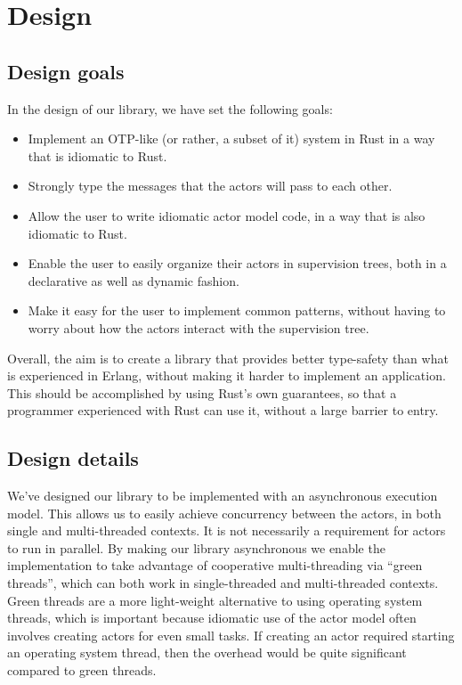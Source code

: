 \documentclass[a4paper]{article}
\begin{document}
\section{Design}
\subsection{Design goals}
In the design of our library, we have set the following goals:
\begin{itemize}
\item Implement an OTP-like (or rather, a subset of it) system in Rust in a way
  that is idiomatic to Rust.
\item Strongly type the messages that the actors will pass to each other.
\item Allow the user to write idiomatic actor model code, in a way that is also
  idiomatic to Rust.
\item Enable the user to easily organize their actors in supervision trees, both
  in a declarative as well as dynamic fashion.
\item Make it easy for the user to implement common patterns, without having to
  worry about how the actors interact with the supervision tree.
\end{itemize}

\noindent
Overall, the aim is to create a library that provides better type-safety than
what is experienced in Erlang, without making it harder to implement an
application. This should be accomplished by using Rust's own guarantees, so that
a programmer experienced with Rust can use it, without a large barrier to entry.

\subsection{Design details}
We've designed our library to be implemented with an asynchronous execution
model. This allows us to easily achieve concurrency between the actors, in both
single and multi-threaded contexts. It is not necessarily a requirement for
actors to run in parallel. By making our library asynchronous we enable the
implementation to take advantage of cooperative multi-threading via ``green
threads'', which can both work in single-threaded and multi-threaded contexts.
Green threads are a more light-weight alternative to using operating system
threads, which is important because idiomatic use of the actor model often
involves creating actors for even small tasks. If creating an actor required
starting an operating system thread, then the overhead would be quite significant
compared to green threads.\\
\end{document}
